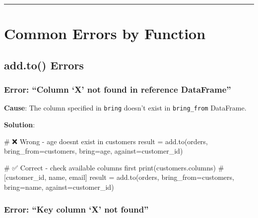\documentclass[
  letterpaper,
]{scrbook}
\newenvironment{Shaded}{\begin{snugshade}}{\end{snugshade}}
\newcommand{\BuiltInTok}[1]{\textcolor[rgb]{0.00,0.23,0.31}{#1}}
\newcommand{\CommentTok}[1]{\textcolor[rgb]{0.37,0.37,0.37}{#1}}
\newcommand{\NormalTok}[1]{\textcolor[rgb]{0.00,0.23,0.31}{#1}}
\newcommand{\OperatorTok}[1]{\textcolor[rgb]{0.37,0.37,0.37}{#1}}
\newcommand{\StringTok}[1]{\textcolor[rgb]{0.13,0.47,0.30}{#1}}
\begin{document}
\begin{center}\rule{0.5\linewidth}{0.5pt}\end{center}

\section{Common Errors by Function}\label{common-errors-by-function}

\subsection{add.to() Errors}\label{add.to-errors}

\subsubsection{Error: ``Column `X' not found in reference
DataFrame''}\label{error-column-x-not-found-in-reference-dataframe}

\textbf{Cause}: The column specified in \texttt{bring} doesn't exist in
\texttt{bring\_from} DataFrame.

\textbf{Solution}:

\begin{Shaded}
\begin{Highlighting}[]
\CommentTok{\# ❌ Wrong {-} \textquotesingle{}age\textquotesingle{} doesn\textquotesingle{}t exist in customers}
\NormalTok{result }\OperatorTok{=}\NormalTok{ add.to(orders, bring\_from}\OperatorTok{=}\NormalTok{customers, bring}\OperatorTok{=}\StringTok{\textquotesingle{}age\textquotesingle{}}\NormalTok{, against}\OperatorTok{=}\StringTok{\textquotesingle{}customer\_id\textquotesingle{}}\NormalTok{)}

\CommentTok{\# ✅ Correct {-} check available columns first}
\BuiltInTok{print}\NormalTok{(customers.columns)  }\CommentTok{\# [\textquotesingle{}customer\_id\textquotesingle{}, \textquotesingle{}name\textquotesingle{}, \textquotesingle{}email\textquotesingle{}]}
\NormalTok{result }\OperatorTok{=}\NormalTok{ add.to(orders, bring\_from}\OperatorTok{=}\NormalTok{customers, bring}\OperatorTok{=}\StringTok{\textquotesingle{}name\textquotesingle{}}\NormalTok{, against}\OperatorTok{=}\StringTok{\textquotesingle{}customer\_id\textquotesingle{}}\NormalTok{)}
\end{Highlighting}
\end{Shaded}

\subsubsection{Error: ``Key column `X' not
found''}\label{error-key-column-x-not-found}
\end{document}
